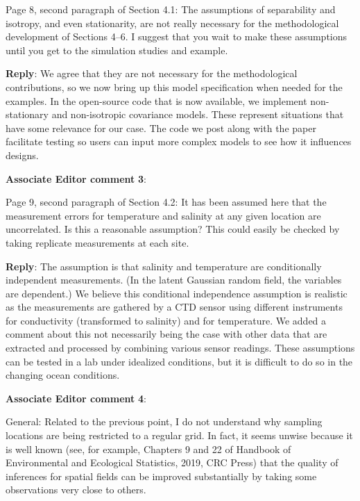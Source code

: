 \documentclass[a4paper]{article}
\def\aecom{\textbf{Associate Editor comment }}
\def\reply{\textbf{Reply}}
\begin{document}
Page 8, second paragraph of Section 4.1: The assumptions of separability and isotropy, and even stationarity, are not really necessary for the methodological development of Sections 4–6. I suggest that you wait to make these assumptions until you get to the simulation studies and example.\par

\reply: We agree that they are not necessary for the methodological contributions, so we now bring up this model specification when needed for the examples. 
In the open-source code that is now available, we implement non-stationary and non-isotropic covariance models. These represent situations that have some relevance for our case. The code we post along with the paper facilitate testing so users can input more complex models to see how it influences designs. 

\vspace{1em}

\vspace{5mm}
\noindent \aecom \textbf{3}:

Page 9, second paragraph of Section 4.2: It has been assumed here that the measurement errors for temperature and salinity at any given location are uncorrelated. Is this a reasonable assumption? This could easily be checked by taking replicate measurements at each site.\par

\reply: The assumption is that salinity and temperature are conditionally independent measurements. (In the latent Gaussian random field, the variables are dependent.) We believe this conditional independence assumption is realistic as the measurements are gathered by a CTD sensor using different instruments for conductivity (transformed to salinity) and for temperature. 
We added a comment about this not necessarily being the case with other data that are extracted and processed by combining various sensor readings. 
These assumptions can be tested in a lab under idealized conditions, but it is difficult to do so in the changing ocean conditions. 

\vspace{1em}

\vspace{5mm}
\noindent \aecom \textbf{4}:

General: Related to the previous point, I do not understand why sampling locations are being restricted to a regular grid. In fact, it seems unwise because it is well known (see, for example, Chapters 9 and 22 of Handbook of Environmental and Ecological Statistics, 2019, CRC Press) that the quality of inferences for spatial fields can be improved substantially by taking some
observations very close to others.\par
\end{document}

